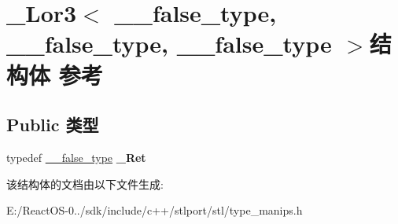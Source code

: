 \hypertarget{struct___lor3_3_01____false__type_00_01____false__type_00_01____false__type_01_4}{}\section{\+\_\+\+Lor3$<$ \+\_\+\+\_\+false\+\_\+type, \+\_\+\+\_\+false\+\_\+type, \+\_\+\+\_\+false\+\_\+type $>$结构体 参考}
\label{struct___lor3_3_01____false__type_00_01____false__type_00_01____false__type_01_4}
\subsection*{Public 类型}
\begin{DoxyCompactItemize}
\item 
\mbox{\label{struct___lor3_3_01____false__type_00_01____false__type_00_01____false__type_01_4_a25268213dfe813476cf20bdc1128d435}} 
typedef \hyperlink{struct____false__type}{\+\_\+\+\_\+false\+\_\+type} {\bfseries \+\_\+\+Ret}
\end{DoxyCompactItemize}


该结构体的文档由以下文件生成\+:\begin{DoxyCompactItemize}
\item 
E\+:/\+React\+O\+S-\/0../sdk/include/c++/stlport/stl/type\+\_\+manips.\+h\end{DoxyCompactItemize}
